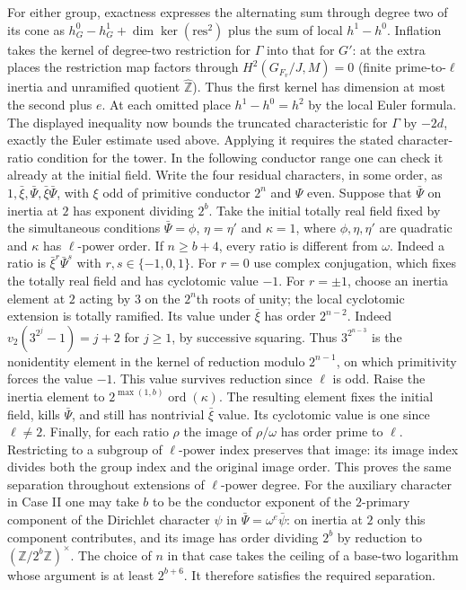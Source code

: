\documentclass[11pt]{amsart}
\theoremstyle{definition}
\theoremstyle{remark}
\begin{document}
For either group, exactness expresses the alternating sum through
degree two of its cone as $h^0_G-h^1_G+\dim\ker(\mathrm{res}^2)$
plus the sum of local $h^1-h^0$. Inflation takes the kernel of
degree-two restriction for $\Gamma$ into that for $G'$: at the
extra places the restriction map factors through $H^2(G_{F_v}/J,M)=0$
(finite prime-to-$\ell$ inertia and unramified quotient
$\widehat{\mathbb Z}$). Thus the first kernel has dimension at most
the second plus $e$. At each omitted place $h^1-h^0=h^2$ by the
local Euler formula. The displayed inequality now bounds the
truncated characteristic for $\Gamma$ by $-2d$, exactly the
Euler estimate used above. Applying it requires the stated
character-ratio condition for the tower. In the following conductor
range one can check it already at the initial field. Write the
four residual characters, in some order, as
$1,\bar\xi,\bar\Psi,\bar\xi\bar\Psi$, with $\xi$ odd of primitive
conductor $2^n$ and $\Psi$ even. Suppose that $\bar\Psi$ on inertia
at $2$ has exponent dividing $2^b$. Take the initial totally real
field fixed by the simultaneous conditions
$\bar\Psi=\phi$, $\eta=\eta'$ and $\kappa=1$, where
$\phi,\eta,\eta'$ are quadratic and $\kappa$ has $\ell$-power
order. If $n\ge b+4$, every ratio is different from $\omega$.
Indeed a ratio is $\bar\xi^r\bar\Psi^s$ with $r,s\in\{-1,0,1\}$.
For $r=0$ use complex conjugation, which fixes the totally real
field and has cyclotomic value $-1$. For $r=\pm1$, choose an
inertia element at $2$ acting by $3$ on the $2^n$th roots of unity;
the local cyclotomic extension is totally ramified. Its value under
$\bar\xi$ has order $2^{n-2}$. Indeed
$v_2(3^{2^j}-1)=j+2$ for $j\ge1$, by successive squaring.
Thus $3^{2^{n-3}}$ is the nonidentity element in the kernel of
reduction modulo $2^{n-1}$, on which primitivity forces the value
$-1$. This value survives reduction since $\ell$ is odd.
Raise the inertia element to $2^{\max(1,b)}\operatorname{ord}(\kappa)$.
The resulting element fixes the initial field, kills $\bar\Psi$,
and still has nontrivial $\bar\xi$ value. Its cyclotomic value is
one since $\ell\ne2$. Finally, for each ratio $\rho$ the image of
$\rho/\omega$ has order prime to $\ell$. Restricting to a subgroup
of $\ell$-power index preserves that image: its image index divides
both the group index and the original image order. This proves the
same separation throughout extensions of $\ell$-power degree.
For the auxiliary character in Case II one may take $b$ to be the
conductor exponent of the $2$-primary component of the Dirichlet
character $\psi$ in $\bar\Psi=\omega^e\bar\psi$: on inertia at $2$
only this component contributes, and its image has order dividing
$2^b$ by reduction to $(\mathbb Z/2^b\mathbb Z)^\times$.
The choice of $n$ in that case takes the ceiling of a base-two
logarithm whose argument is at least $2^{b+6}$. It therefore
satisfies the required separation.
\end{document}
